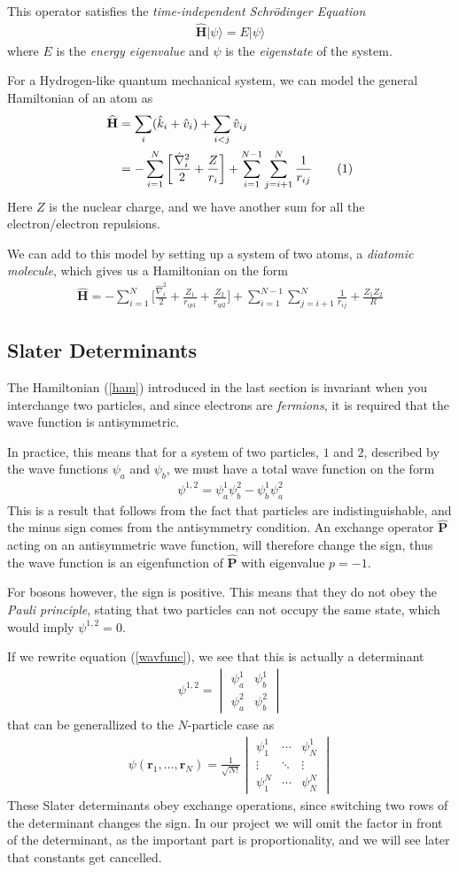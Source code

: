 \documentclass[twocolumns, a4paper,11pt,fleqn]{extarticle}
\newcommand{\eq}[1]{{\small\begin{align*}#1\end{align*}}}
\newcommand{\equ}[1]{{\small\begin{align}#1\end{align}}}
\newcommand{\vmat}[1]{\begin{vmatrix}#1\end{vmatrix}}
\newcommand{\ket}[1]{|#1\rangle}
\newcommand\numberthis{\addtocounter{equation}{1}\tag{\theequation}}
\renewcommand\vec[1]{\boldsymbol{\mathbf{#1}}}
\newcommand{\OP}[1]{\mathbf{\widehat{#1}}}
\newcommand{\op}[1]{\hat{#1}}
\begin{document}
This operator satisfies the \textit{time-independent Schr\"odinger Equation}
\eq{
  \OP H \ket{\psi} = E \ket{\psi}
}
where $E$ is the \textit{energy eigenvalue} and $\psi$ is the \textit{eigenstate} of the system.

For a Hydrogen-like quantum mechanical system, we can model the general
Hamiltonian of an atom as
\eq{
  \OP H
  &=\sum_i (\op k_i + \op v_i)  + \sum_{i<j} \op v_{ij}\\
  &= -\sum_{i=1}^N\bigg[
    \frac{\op\nabla_i^2}{2} + \frac{Z}{r_i}\bigg] 
  + \sum_{i=1}^{N-1}\sum_{j=i+1}^N\frac{1}{r_{ij}} \numberthis\label{ham}
}
Here $Z$ is the nuclear charge, 
and we have another sum for all the electron/electron repulsions.

We can add to this model by setting up a system of two atoms,
a \textit{diatomic molecule}, which gives us a Hamiltonian on the form
\eq{
  \OP H = -\sum_{i=1}^N\bigg[
    \frac{\op\nabla_i^2}{2} + \frac{Z_1}{r_{ip1}} + \frac{Z_2}{r_{ip2}}\bigg] 
    + \sum_{i=1}^{N-1}\sum_{j=i+1}^N\frac{1}{r_{ij}} + \frac{Z_1 Z_2}{R}
}

\subsection{Slater Determinants}
The Hamiltonian (\ref{ham}) introduced in the last section is invariant
when you interchange two particles, and since electrons are \textit{fermions},
it is required that the wave function is antisymmetric.

In practice, this means that for a system of two particles, $1$ and $2$, described by the
wave functions $\psi_a$ and $\psi_b$, we must have a total wave function on the form
\equ{
  \psi^{1,2} = \psi_a^1 \psi_b^2 - \psi_b^1 \psi_a^2\label{wavfunc}
}
This is a result that follows from the fact that particles are indistinguishable,
and the minus sign comes from the antisymmetry condition.
An exchange operator $\OP P$ acting on an antisymmetric wave function,
will therefore change the sign, thus the wave function is an eigenfunction
of $\OP P$ with eigenvalue $p=-1$.

For bosons however, the sign is positive. This means that 
they do not obey the \textit{Pauli principle},
stating that two particles can not occupy the same state, 
which would imply $\psi^{1,2}=0$.

If we rewrite equation (\ref{wavfunc}), we see that this is actually a determinant
\eq{
  \psi^{1,2} = \vmat{\psi_a^1&\psi_b^1\\ \psi_a^2&\psi_b^2}
}
that can be generallized to the $N$-particle case as
\equ{
  \psi(\vec r_1, \dots, \vec r_N) 
  = \frac{1}{\sqrt{N!}}\vmat{\psi_1^1&\cdots&\psi_N^1\\ 
  \vdots & \ddots & \vdots \\ 
  \psi_1^N& \cdots &\psi_N^N}\label{slaterdet}
}
These Slater determinants obey exchange operations, since switching
two rows of the determinant changes the sign.
In our project we will omit the factor in front of the determinant,
as the important part is proportionality, and we will see later that constants get cancelled.
\end{document}
